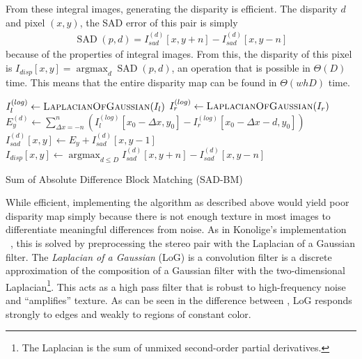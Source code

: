 \documentclass{article}
\newcommand{\proc}[1]{\textnormal{\scshape#1}}
\DeclareMathOperator*{\argmin}{argmax}
\DeclareMathOperator{\LoG}{\proc{LaplacianOfGaussian}}
\DeclareMathOperator{\SAD}{SAD}
\begin{document}
From these integral images, generating the disparity is efficient. The
disparity $d$ and pixel $(x, y)$, the SAD error of this pair is simply
\begin{align*}
    \SAD(p, d) = I_{sad}^{(d)}[x, y + n] - I_{sad}^{(d)}[x, y - n]
\end{align*}
because of the properties of integral images. From this, the disparity of this
pixel is $I_{disp}[x, y] = \argmin_{d} \SAD(p, d)$, an operation that is
possible in $\Theta(D)$ time. This means that the entire disparity map can be
found in $\Theta(whD)$ time.

\begin{algorithm}[t]
    $I_l^{(log)} \gets \LoG(I_l)$ \;
    $I_r^{(log)} \gets \LoG(I_r)$ \;
     {
         {
            $E_y^{(d)} \gets \sum_{\Delta x = -n}^n \left(
                          I_l^{(log)}[x_0 - \Delta x, y_0]
                          - I_r^{(log)}[x_0 - \Delta x - d, y_0] \right)$ \;
            $I_{sad}^{(d)}[x, y] \gets E_y + I_{sad}^{(d)}[x, y - 1]$ \;
        }
    }
     {
        $I_{disp}[x, y] \gets \argmin_{d \le D} I_{sad}^{(d)}[x, y + n] - I_{sad}^{(d)}[x, y - n]$ \;
    }
    \caption{Sum of Absolute Difference Block Matching (SAD-BM)}
    \label{alg:serial}
\end{algorithm}

While efficient, implementing the algorithm as described above would yield poor
disparity map simply because there is not enough texture in most images to
differentiate meaningful differences from noise. As in Konolige's
implementation ~\cite{konolige97}, this is solved by preprocessing the stereo
pair with the Laplacian of a Gaussian filter. The \textit{Laplacian of a
Gaussian} (LoG) is a convolution filter is a discrete approximation of the
composition of a Gaussian filter with the two-dimensional
Laplacian\footnote{The Laplacian is the sum of unmixed second-order partial
derivatives.}. This acts as a high pass filter that is robust to high-frequency
noise and ``amplifies'' texture. As can be seen in the difference between
, LoG responds strongly to edges and
weakly to regions of constant color.
\end{document}
